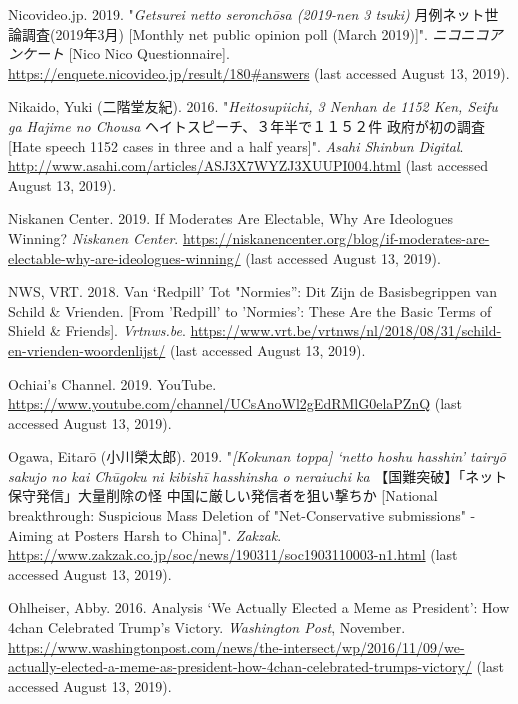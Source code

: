 \documentclass[10pt,british,A4paper,twoside]{memoir}
\begin{document}
\hypertarget{ref-nicovideo.jp_monthly_2019}{}
Nicovideo.jp. 2019. "\emph{Getsurei netto seronchōsa (2019-nen 3 tsuki)} 月例ネット世論調査(2019年3月) [Monthly net public opinion poll (March 2019)]".
\emph{ニコニコアンケート} [Nico Nico Questionnaire].
\url{https://enquete.nicovideo.jp/result/180\#answers} (last accessed August 13, 2019).

\hypertarget{ref-nikaido_eng:_2016}{}
Nikaido, Yuki (二階堂友紀). 2016. "\emph{Heitosupiichi, 3 Nenhan de 1152 Ken, Seifu ga Hajime no Chousa} ヘイトスピーチ、３年半で１１５２件 政府が初の調査 [Hate speech 1152 cases in three and a half years]". \emph{Asahi Shinbun Digital}.
\url{http://www.asahi.com/articles/ASJ3X7WYZJ3XUUPI004.html} (last accessed August 13, 2019).

\hypertarget{ref-niskanen_center_if_2019}{}
Niskanen Center. 2019. If Moderates Are Electable, Why Are Ideologues
Winning? \emph{Niskanen Center}.
\url{https://niskanencenter.org/blog/if-moderates-are-electable-why-are-ideologues-winning/} (last accessed August 13, 2019).

\hypertarget{ref-nws_van_2018}{}
NWS, VRT. 2018. Van `Redpill' Tot "Normies'': Dit Zijn de Basisbegrippen
van Schild \& Vrienden. [From 'Redpill' to 'Normies': These Are the Basic Terms of Shield \& Friends]. \emph{Vrtnws.be}.
\url{https://www.vrt.be/vrtnws/nl/2018/08/31/schild-en-vrienden-woordenlijst/} (last accessed August 13, 2019).

\hypertarget{ref-noauthor_ochiais_nodate}{}
Ochiai's Channel. 2019. YouTube.
\url{https://www.youtube.com/channel/UCsAnoWl2gEdRMlG0elaPZnQ} (last accessed August 13, 2019).

\hypertarget{ref-ogawa_eng._2019}{}
Ogawa, Eitarō (小川榮太郎). 2019. "\emph{[Kokunan toppa] `netto hoshu hasshin' tairyō sakujo no kai Chūgoku ni kibishī hasshinsha o neraiuchi ka} 【国難突破】「ネット保守発信」大量削除の怪 中国に厳しい発信者を狙い撃ちか [National breakthrough: Suspicious Mass Deletion of "Net-Conservative submissions" - Aiming at Posters Harsh to China]". \emph{Zakzak}.
\url{https://www.zakzak.co.jp/soc/news/190311/soc1903110003-n1.html} (last accessed August 13, 2019).

\hypertarget{ref-ohlheiser_analysis_2016}{}
Ohlheiser, Abby. 2016. Analysis `We Actually Elected a Meme as
President': How 4chan Celebrated Trump's Victory. \emph{Washington
Post}, November.
\url{https://www.washingtonpost.com/news/the-intersect/wp/2016/11/09/we-actually-elected-a-meme-as-president-how-4chan-celebrated-trumps-victory/} (last accessed August 13, 2019).
\end{document}
